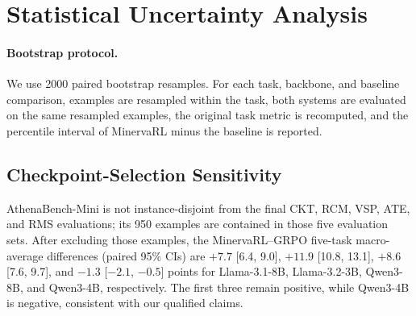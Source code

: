 \section{Statistical Uncertainty Analysis}
\label{app:uncertainty}

\paragraph{Bootstrap protocol.}
We use 2000 paired bootstrap resamples. For each task, backbone, and baseline comparison, examples are resampled within the task, both systems are evaluated on the same resampled examples, the original task metric is recomputed, and the percentile interval of MinervaRL minus the baseline is reported.

\begin{table}[!htbp]
\centering
\scriptsize
\caption{Paired bootstrap 95\% confidence intervals for MinervaRL minus each baseline on the 12-task macro average. The macro average is the unweighted mean over the 12 task metrics and is included for comparability with .}
\label{tab:app-average-pairwise-ci}
\setlength{\tabcolsep}{3pt}
\renewcommand{\arraystretch}{0.95}
\end{table}

\subsection{Checkpoint-Selection Sensitivity}
\label{app:checkpoint-selection-sensitivity}
AthenaBench-Mini is not instance-disjoint from the final CKT, RCM, VSP, ATE, and RMS evaluations; its 950 examples are contained in those five evaluation sets. After excluding those examples, the MinervaRL--GRPO five-task macro-average differences (paired 95\% CIs) are $+7.7$ [6.4, 9.0], $+11.9$ [10.8, 13.1], $+8.6$ [7.6, 9.7], and $-1.3$ [$-2.1$, $-0.5$] points for Llama-3.1-8B, Llama-3.2-3B, Qwen3-8B, and Qwen3-4B, respectively. The first three remain positive, while Qwen3-4B is negative, consistent with our qualified claims.

